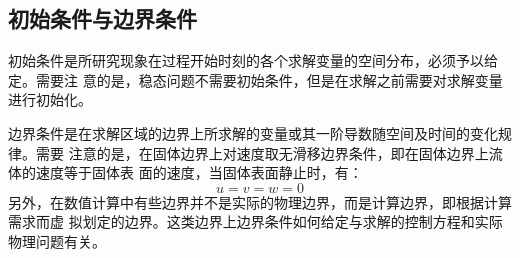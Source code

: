 \subsection{初始条件与边界条件}
初始条件是所研究现象在过程开始时刻的各个求解变量的空间分布，必须予以给定。需要注
意的是，稳态问题不需要初始条件，但是在求解之前需要对求解变量进行初始化。

边界条件是在求解区域的边界上所求解的变量或其一阶导数随空间及时间的变化规律。需要
注意的是，在固体边界上对速度取无滑移边界条件，即在固体边界上流体的速度等于固体表
面的速度，当固体表面静止时，有：
\begin{equation}
u=v=w=0
\end{equation}
另外，在数值计算中有些边界并不是实际的物理边界，而是计算边界，即根据计算需求而虚
拟划定的边界。这类边界上边界条件如何给定与求解的控制方程和实际物理问题有关。
